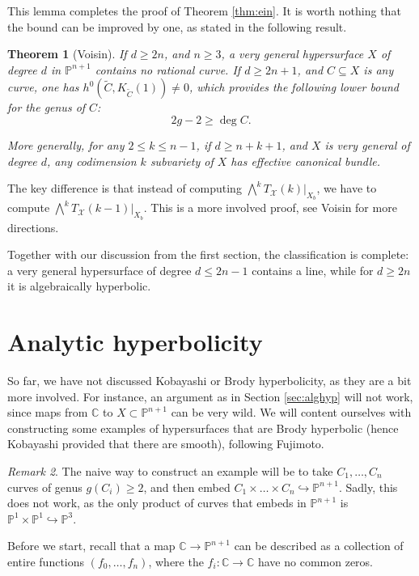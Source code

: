 \documentclass[leqno, openany]{memoir}
\newtheorem{thm}{Theorem}[section]
\theoremstyle{definition}
\theoremstyle{remark}
\newtheorem{rmk}[thm]{Remark}
\theoremstyle{plain}
\theoremstyle{definition}
\theoremstyle{remark}
\newcommand{\C}{\mathbb{C}}
\renewcommand{\P}{\mathbb{P}}
\newcommand{\mc}[1]{\mathcal{#1}}
\begin{document}
This lemma completes the proof of Theorem \ref{thm:ein}. It is worth nothing that the bound can be improved by one, as stated in the following result.

\begin{thm}[Voisin]
If $d \geq 2n$, and $n \geq 3$, a very general hypersurface $X$ of degree $d$ in $\P^{n+1}$ contains no rational curve. If $d \geq 2n+1$, and $C \subseteq X$ is any curve, one has $h^0(\tilde{C}, K_{\tilde{C}}(1))\neq 0$, which provides the following lower bound for the genus of $C$:
\[ 2g-2 \geq \deg C. \]

More generally, for any $2 \leq k \leq n-1$, if $d\geq n+k+1$, and $X$ is very general of degree $d$, any codimension $k$ subvariety of $X$ has effective canonical bundle. 
\end{thm}

The key difference is that instead of computing $\bigwedge^k T_{ \mc{X} }(k)|_{X_b}$, we have to compute $\bigwedge^k T_{ \mc{X} }(k-1)|_{X_b}$. This is a more involved proof, see Voisin for more directions.

Together with our discussion from the first section, the classification is complete: a very general hypersurface of degree $d\leq 2n-1$ contains a line, while for $d \geq 2n$ it is algebraically hyperbolic.

\section{Analytic hyperbolicity}

So far, we have not discussed Kobayashi or Brody hyperbolicity, as they are a bit more involved. For instance, an argument as in Section \ref{sec:alghyp} will not work, since maps from $\C$ to $X \subset \P^{n+1}$ can be very wild. We will content ourselves with constructing some examples of hypersurfaces that are Brody hyperbolic (hence Kobayashi provided that there are smooth), following Fujimoto.

\begin{rmk}
The naive way to construct an example will be to take $C_1, \dots, C_n$ curves of genus $g(C_i) \geq 2$, and then embed $C_1 \times \dots \times C_n \hookrightarrow \P^{n+1}$. Sadly, this does not work, as the only product of curves that embeds in $\P^{n+1}$ is $\P^1 \times \P^1 \hookrightarrow \P^3$. 
\end{rmk}

Before we start, recall that a map $\C \to \P^{n+1}$ can be described as a collection of entire functions $(f_0,\dots, f_n)$, where the $f_i\colon \C \to \C$ have no common zeros.
\end{document}
